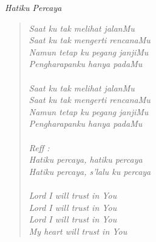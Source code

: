 \small
\begin{center}
\itshape{Hatiku Percaya}
\end{center}


\begin{verse}
\itshape{
Saat ku tak melihat jalanMu\\
Saat ku tak mengerti rencanaMu\\
Namun tetap ku pegang janjiMu\\
Pengharapanku hanya padaMu\\
{~}\\
Saat ku tak melihat jalanMu\\
Saat ku tak mengerti rencanaMu\\
Namun tetap ku pegang janjiMu\\
Pengharapanku hanya padaMu\\
{~}\\
Reff :\\
Hatiku percaya, hatiku percaya\\
Hatiku percaya, s'lalu ku percaya\\
{~}\\
Lord I will trust in You\\
Lord I will trust in You\\
Lord I will trust in You\\
My heart will trust in You
}
\end{verse}
\normalsize